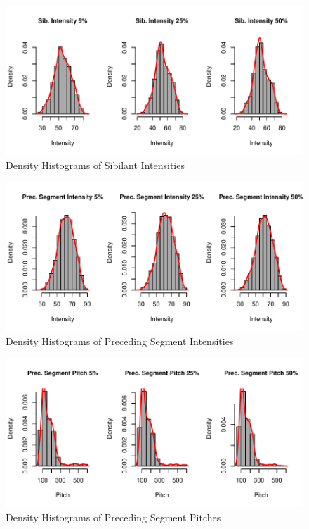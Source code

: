 \documentclass[a4paper]{article}
\begin{document}
\begin{figure}[h]
  \begin{center}
\includegraphics{prelim-017}
  \caption{Density Histograms of Sibilant Intensities}
  \label{fig:sib.intensity}
  \end{center}
\end{figure}
\begin{figure}[h]
  \begin{center}
\includegraphics{prelim-019}
  \caption{Density Histograms of Preceding Segment Intensities}
  \label{fig:prec.intensity}
  \end{center}
\end{figure}

\begin{figure}[h!]
  \begin{center}
\includegraphics{prelim-021}
  \caption{Density Histograms of Preceding Segment Pitches}
  \label{fig:prec.pitch}
  \end{center}
\end{figure}
\end{document}
